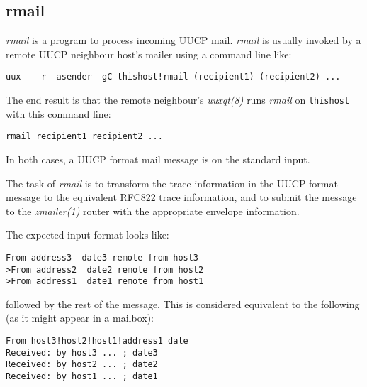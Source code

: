 \subsection{rmail}

{\em rmail\/} is a program to process incoming UUCP mail.
{\em rmail\/} is usually invoked by a remote UUCP neighbour host's
mailer using a command line like:

\begin{tscreen}
\begin{verbatim}
uux - -r -asender -gC thishost!rmail (recipient1) (recipient2) ...
\end{verbatim}
\end{tscreen}


The end result is that the remote neighbour's {\em uuxqt(8)\/} runs
{\em rmail\/} on {\tt thishost} with this command line:

\begin{tscreen}
\begin{verbatim}
rmail recipient1 recipient2 ...
\end{verbatim}
\end{tscreen}


In both cases, a UUCP format mail message is on the standard input.

The task of {\em rmail\/} is to transform the trace information in
the UUCP format message to the equivalent RFC822 trace
information, and to submit the message to the {\em zmailer(1)\/}
router with the appropriate envelope information.

The expected input format looks like:

\begin{tscreen}
\begin{verbatim}
From address3  date3 remote from host3
>From address2  date2 remote from host2
>From address1  date1 remote from host1
\end{verbatim}
\end{tscreen}


followed by the rest of the message. This is considered
equivalent to the following (as it might appear in a mailbox):

\begin{tscreen}
\begin{verbatim}
From host3!host2!host1!address1 date
Received: by host3 ... ; date3
Received: by host2 ... ; date2
Received: by host1 ... ; date1
\end{verbatim}
\end{tscreen}


